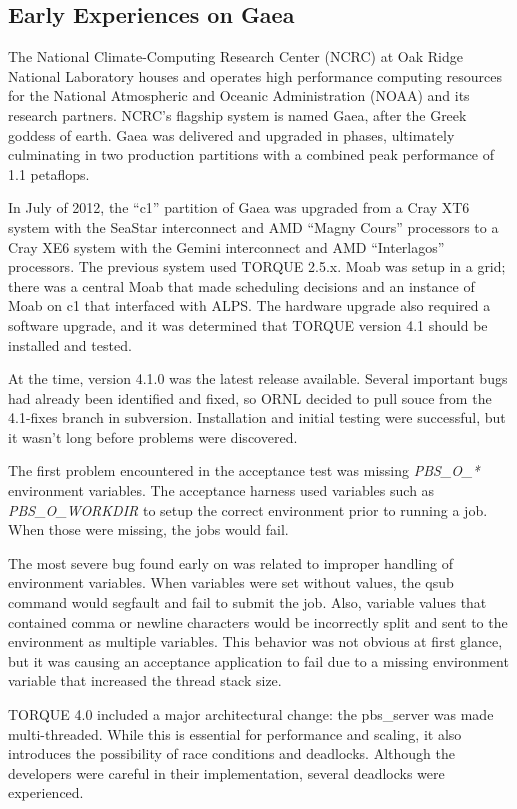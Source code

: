 \subsection{Early Experiences on Gaea}

The National Climate-Computing Research Center (NCRC) at Oak Ridge National
Laboratory houses and operates high performance computing resources for the
National Atmospheric and Oceanic Administration (NOAA) and its research
partners.  NCRC's flagship system is named Gaea, after the Greek goddess of
earth.  Gaea was delivered and upgraded in phases, ultimately culminating in
two production partitions with a combined peak performance of 1.1 petaflops.

In July of 2012, the ``c1'' partition of Gaea was upgraded from a Cray XT6
system with the SeaStar interconnect and AMD ``Magny Cours'' processors to a
Cray XE6 system with the Gemini interconnect and AMD ``Interlagos'' processors.
The previous system used TORQUE 2.5.x.  Moab was setup in a grid; there was a
central Moab that made scheduling decisions and an instance of Moab on c1 that
interfaced with ALPS.  The hardware upgrade also required a software upgrade,
and it was determined that TORQUE version 4.1 should be installed and tested.

At the time, version 4.1.0 was the latest release available.  Several important
bugs had already been identified and fixed, so ORNL decided to pull souce from
the 4.1-fixes branch in subversion.  Installation and initial testing were
successful, but it wasn't long before problems were discovered.

The first problem encountered in the acceptance test was missing \emph{PBS_O_*}
environment variables.  The acceptance harness used variables such as
\emph{PBS_O_WORKDIR} to setup the correct environment prior to running a job.
When those were missing, the jobs would fail.

The most severe bug found early on was related to improper handling of
environment variables.  When variables were set without values, the qsub
command would segfault and fail to submit the job.  Also, variable values that
contained comma or newline characters would be incorrectly split and sent to
the environment as multiple variables.  This behavior was not obvious at first
glance, but it was causing an acceptance application to fail due to a missing
environment variable that increased the thread stack size.

TORQUE 4.0 included a major architectural change: the pbs_server was made
multi-threaded.  While this is essential for performance and scaling, it also
introduces the possibility of race conditions and deadlocks.  Although the
developers were careful in their implementation, several deadlocks were
experienced.

